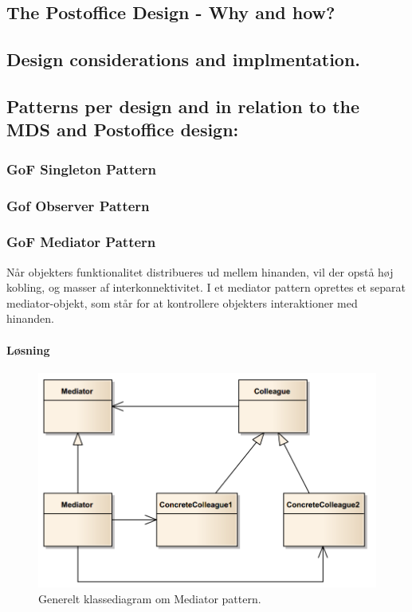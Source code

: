 \subsection{The Postoffice Design - Why and how?}

\subsection{Design considerations and implmentation.}

\subsection{Patterns per design and in relation to the MDS and Postoffice design:}

\subsubsection{GoF Singleton Pattern}

\subsubsection{Gof Observer Pattern}

\subsubsection{GoF Mediator Pattern}
Når objekters funktionalitet distribueres ud mellem hinanden, vil der opstå høj kobling, og masser af interkonnektivitet.  I et mediator pattern oprettes et separat mediator-objekt, som står for at kontrollere objekters interaktioner med hinanden. 

\paragraph{Løsning}

\begin{figure}[h]
	\centering
	\includegraphics[width=0.8\linewidth]{figs/spm5/concrete}
	\caption{Generelt klassediagram om Mediator pattern.}
	\label{fig:concrete}
\end{figure}

